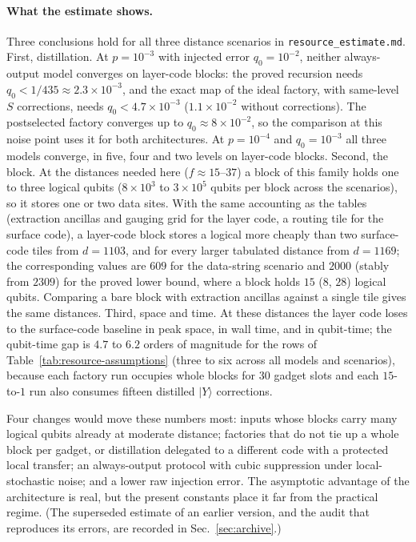\documentclass[aps,prx,reprint,superscriptaddress,nofootinbib,floatfix,longbibliography]{revtex4-2}
\theoremstyle{definition}
\begin{document}
\paragraph{What the estimate shows.}
Three conclusions hold for all three distance scenarios in
\nolinkurl{resource_estimate.md}.  First, distillation.  At $p=10^{-3}$ with
injected error $q_0=10^{-2}$, neither always-output model converges on
layer-code blocks: the proved recursion needs $q_0<1/435\approx2.3\times10^{-3}$,
and the exact map of the ideal factory, with same-level $S$ corrections,
needs $q_0<4.7\times10^{-3}$ ($1.1\times10^{-2}$ without corrections).  The
postselected factory converges up to $q_0\approx8\times10^{-2}$, so the
comparison at this noise point uses it for both architectures.  At $p=10^{-4}$
and $q_0=10^{-3}$ all three models converge, in five, four and two levels on
layer-code blocks.  Second, the block.  At the distances needed here
($f\approx15$--$37$) a block of this family holds one to three logical
qubits ($8\times10^3$ to $3\times10^5$ qubits per block across the scenarios),
so it stores one or two data sites.  With the same accounting as the tables
(extraction ancillas and gauging grid for the layer code, a routing tile for
the surface code), a layer-code block stores a logical more cheaply than two
surface-code tiles from $d=1103$, and for every larger tabulated distance from
$d=1169$; the corresponding values are $609$ for the data-string scenario and
$2000$ (stably from $2309$) for the proved lower bound, where a block holds
$15$ ($8$, $28$) logical qubits.  Comparing a bare block with extraction
ancillas against a single tile gives the same distances.  Third, space and time.
At these distances the layer code loses to the surface-code baseline in peak
space, in wall time, and in qubit-time; the qubit-time gap is $4.7$ to $6.2$
orders of magnitude for the rows of Table~\ref{tab:resource-assumptions} (three
to six across all models and scenarios), because each factory run occupies whole blocks for $30$
gadget slots and each $15$-to-$1$ run also consumes fifteen distilled
$|Y\rangle$ corrections.

Four changes would move these numbers most: inputs whose blocks carry many
logical qubits already at moderate distance; factories that do not tie up a
whole block per gadget, or distillation delegated to a different code with a
protected local transfer; an always-output protocol with cubic suppression
under local-stochastic noise; and a lower raw injection error.  The
asymptotic advantage of the architecture is real, but the present constants
place it far from the practical regime.  (The superseded estimate of an
earlier version, and the audit that reproduces its errors, are recorded in
Sec.~\ref{sec:archive}.)
\end{document}
